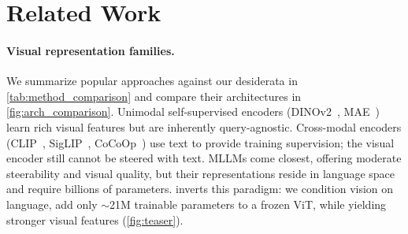 \section{Related Work}
\label{sec:related_work}



\paragraph{Visual representation families.}
We summarize popular approaches against our desiderata in \cref{tab:method_comparison} and compare their architectures in \cref{fig:arch_comparison}.
Unimodal self-supervised encoders (DINOv2~\cite{dinov2}, MAE~\cite{he2022mae}) learn rich visual features but are inherently query-agnostic.
Cross-modal encoders (CLIP~\cite{radford2021_clip}, SigLIP~\cite{zhai2023_siglip}, CoCoOp~\cite{zhou2022_cocoop}) use text to provide training supervision; the visual encoder still cannot be steered with text.
MLLMs come closest, offering moderate steerability and visual quality, but their representations reside in language space and require billions of parameters.
\model{} inverts this paradigm: we condition vision on language, add only ${\sim}$21M trainable parameters to a frozen ViT, while yielding stronger visual features (\cref{fig:teaser}).

